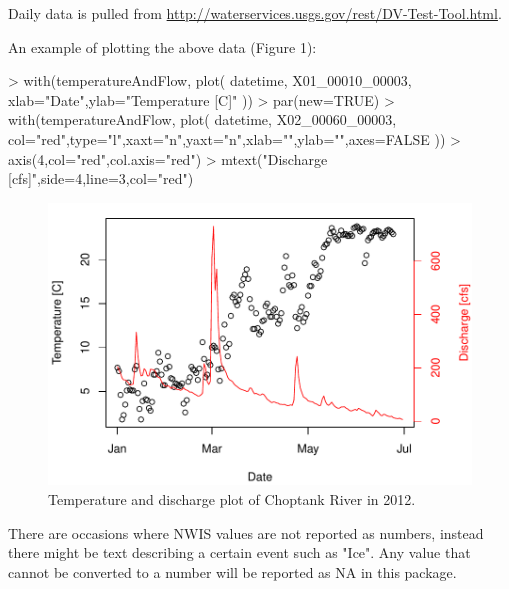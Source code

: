 \documentclass[a4paper,11pt]{article}
\begin{document}
Daily data is pulled from \url{http://waterservices.usgs.gov/rest/DV-Test-Tool.html}. 

An example of plotting the above data (Figure 1):

\begin{Schunk}
\begin{Sinput}
> with(temperatureAndFlow, plot(
   datetime, X01_00010_00003,
   xlab="Date",ylab="Temperature [C]"
   ))
> par(new=TRUE)
> with(temperatureAndFlow, plot(
   datetime, X02_00060_00003,
   col="red",type="l",xaxt="n",yaxt="n",xlab="",ylab="",axes=FALSE
   ))
> axis(4,col="red",col.axis="red")
> mtext("Discharge [cfs]",side=4,line=3,col="red")
\end{Sinput}
\end{Schunk}
\newpage

\begin{figure}
\begin{center}
\includegraphics{dataRetrieval-fig1}
\end{center}
\caption{Temperature and discharge plot of Choptank River in 2012.}
\end{figure}


There are occasions where NWIS values are not reported as numbers, instead there might be text describing a certain event such as "Ice".  Any value that cannot be converted to a number will be reported as NA in this package.


\end{document}
